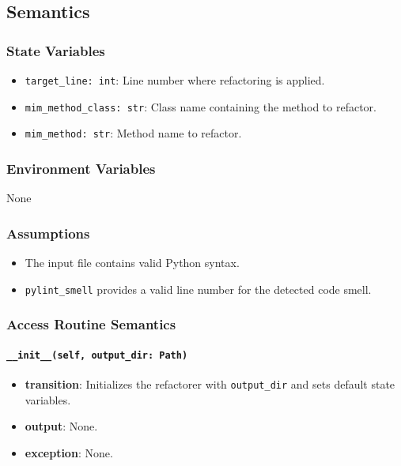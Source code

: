 \documentclass[12pt, titlepage]{article}
\begin{document}
\subsection{Semantics}
  
\subsubsection{State Variables}
\begin{itemize}
  \item \texttt{target\_line: int}: Line number where refactoring is applied.
  \item \texttt{mim\_method\_class: str}: Class name containing the method to refactor.
  \item \texttt{mim\_method: str}: Method name to refactor.
\end{itemize}
  
\subsubsection{Environment Variables}
None
  
\subsubsection{Assumptions}
\begin{itemize}
  \item The input file contains valid Python syntax.
  \item \texttt{pylint\_smell} provides a valid line number for the detected code smell.
\end{itemize}
  
\subsubsection{Access Routine Semantics}
  
\paragraph{\texttt{\_\_init\_\_(self, output\_dir: Path)}}
\begin{itemize}
  \item \textbf{transition}: Initializes the refactorer with \texttt{output\_dir} and sets default state variables.
  \item \textbf{output}: None.
  \item \textbf{exception}: None.
\end{itemize}
  
\end{document}
